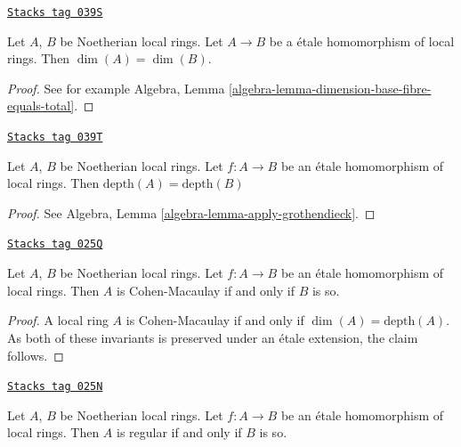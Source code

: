 \begin{lemma}
\label{etale-lemma-etale-dimension}
\href{https://stacks.math.columbia.edu/tag/039S}{\texttt{Stacks tag 039S}}

Let $A$, $B$ be Noetherian local rings.
Let $A \to B$ be a \'etale homomorphism of local rings.
Then $\dim(A) = \dim(B)$.
\end{lemma}

\begin{proof}
See for example
Algebra, Lemma \ref{algebra-lemma-dimension-base-fibre-equals-total}.
\end{proof}

\begin{proposition}
\label{etale-proposition-etale-depth}
\href{https://stacks.math.columbia.edu/tag/039T}{\texttt{Stacks tag 039T}}

Let $A$, $B$ be Noetherian local rings.
Let $f : A \to B$ be an \'etale homomorphism of local rings.
Then $\text{depth}(A) = \text{depth}(B)$
\end{proposition}

\begin{proof}
See Algebra, Lemma \ref{algebra-lemma-apply-grothendieck}.
\end{proof}

\begin{proposition}
\label{etale-proposition-etale-CM}
\href{https://stacks.math.columbia.edu/tag/025Q}{\texttt{Stacks tag 025Q}}


Let $A$, $B$ be Noetherian local rings.
Let $f : A \to B$ be an \'etale homomorphism of local rings.
Then $A$ is Cohen-Macaulay if and only if $B$ is so.
\end{proposition}

\begin{proof}
A local ring $A$ is Cohen-Macaulay if and only if $\dim(A) = \text{depth}(A)$.
As both of these invariants is preserved under an \'etale extension,
the claim follows.
\end{proof}

\begin{proposition}
\label{etale-proposition-etale-regular}
\href{https://stacks.math.columbia.edu/tag/025N}{\texttt{Stacks tag 025N}}

Let $A$, $B$ be Noetherian local rings.
Let $f : A \to B$ be an \'etale homomorphism of local rings.
Then $A$ is regular if and only if $B$ is so.
\end{proposition}

